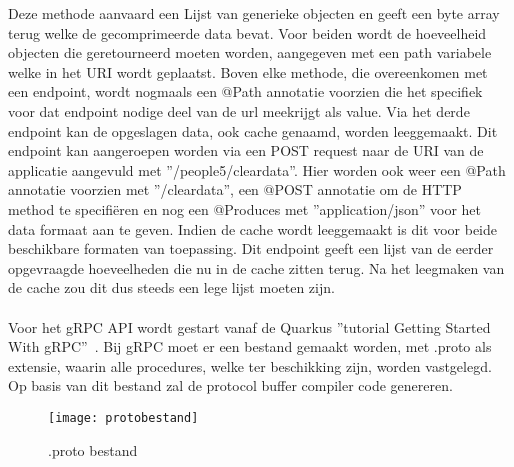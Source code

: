 Deze methode aanvaard een Lijst van generieke objecten en geeft een byte array terug welke de gecomprimeerde data bevat.
Voor beiden wordt de hoeveelheid objecten die geretourneerd moeten worden, aangegeven met een path variabele welke in het URI wordt geplaatst.
Boven elke methode, die overeenkomen met een endpoint, wordt nogmaals een @Path annotatie voorzien die het specifiek voor dat endpoint nodige deel van de url meekrijgt als value.
Via het derde endpoint kan de opgeslagen data, ook cache genaamd, worden leeggemaakt. Dit endpoint kan aangeroepen worden via een POST request naar
de URI van de applicatie aangevuld met ''/people5/cleardata''. Hier worden ook weer een @Path annotatie voorzien met ''/cleardata'', een @POST annotatie om de HTTP method te
specifi\"eren en nog een @Produces met ''application/json'' voor het data formaat aan te geven. Indien de cache wordt leeggemaakt is dit voor beide beschikbare formaten van toepassing.
Dit endpoint geeft een lijst van de eerder opgevraagde hoeveelheden die nu in de cache zitten terug.
Na het leegmaken van de cache zou dit dus steeds een lege lijst moeten zijn.\newline
~\autocite{quarkusREST}\\
~\autocite{Jakarta}\\

Voor het gRPC API wordt gestart vanaf de Quarkus ''tutorial Getting Started With gRPC''~\parencite{quarkusgRPC}.
Bij gRPC moet er een bestand gemaakt worden, met .proto als extensie, waarin alle procedures, welke ter beschikking zijn, worden vastgelegd.
Op basis van dit bestand zal de protocol buffer compiler code genereren.

\begin{figure}[ht]
    \centering
    \texttt{[image: protobestand]}
    \caption{.proto bestand}
\end{figure}

